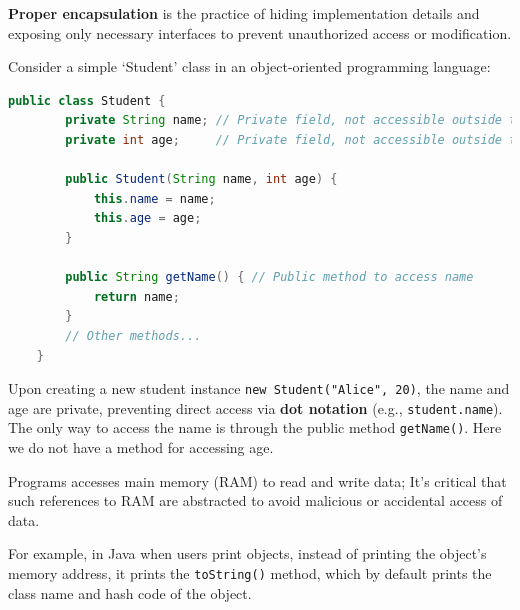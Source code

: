 \begin{Def}

    \label{def:proper_encapsulation}

    \textbf{Proper encapsulation} is the practice of hiding implementation details and exposing only necessary interfaces to prevent unauthorized access or modification.
\end{Def}
\begin{Example}

    \label{ex:student_class}

    Consider a simple `Student' class in an object-oriented programming language:

    \begin{lstlisting}[language=Java, numbers=none]
    public class Student {
        private String name; // Private field, not accessible outside the class
        private int age;     // Private field, not accessible outside the class

        public Student(String name, int age) {
            this.name = name;
            this.age = age;
        }

        public String getName() { // Public method to access name
            return name;
        }
        // Other methods...
    }
    \end{lstlisting}
    Upon creating a new student instance \texttt{new Student("Alice", 20)}, the name and age are private, preventing direct access via \textbf{dot notation} (e.g., \texttt{student.name}).
    The only way to access the name is through the public method \texttt{getName()}. Here we do not have a method for accessing age.
\end{Example}

\begin{Def}

    \label{def:accessing_main_memory}

    Programs accesses main memory (RAM) to read and write data; It's critical that 
    such references to RAM are abstracted to avoid malicious or accidental access of data.

    For example, in Java when users print objects, instead of 
    printing the object's memory address, it prints the \texttt{toString()} method, which by default prints the class name and hash code of the object.
\end{Def}